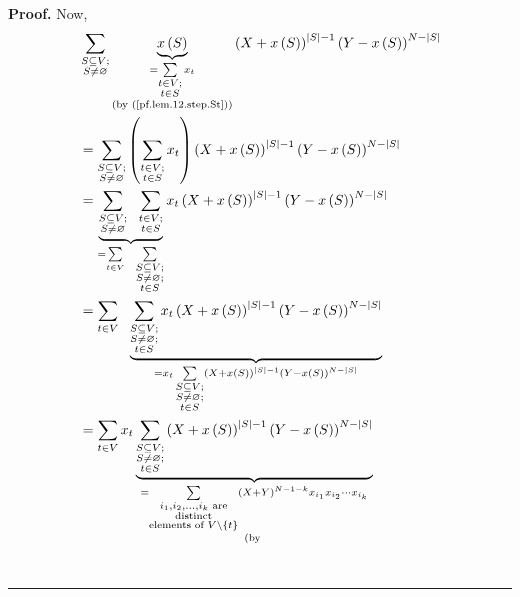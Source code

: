 \documentclass[numbers=enddot,12pt,final,onecolumn,notitlepage]{scrartcl}%
\theoremstyle{definition}
\newenvironment{proof}[1][Proof]{\noindent\textbf{#1.} }{\ \rule{0.5em}{0.5em}}
\let\sumnonlimits\sum
\renewcommand{\sum}{\sumnonlimits\limits}
\newenvironment{verlong}{}{}
\begin{document}
\begin{verlong}
\begin{proof}
Now,
\begin{align*}
&  \sum_{\substack{S\subseteq V;\\S\neq\varnothing}}\underbrace{x\left(
S\right)  }_{\substack{=\sum_{\substack{t\in V;\\t\in S}}x_{t}\\\text{(by
(\ref{pf.lem.12.step.St}))}}}\left(  X+x\left(  S\right)  \right)
^{\left\vert S\right\vert -1}\left(  Y-x\left(  S\right)  \right)
^{N-\left\vert S\right\vert }\\
&  =\sum_{\substack{S\subseteq V;\\S\neq\varnothing}}\left(  \sum
_{\substack{t\in V;\\t\in S}}x_{t}\right)  \left(  X+x\left(  S\right)
\right)  ^{\left\vert S\right\vert -1}\left(  Y-x\left(  S\right)  \right)
^{N-\left\vert S\right\vert }\\
&  =\underbrace{\sum_{\substack{S\subseteq V;\\S\neq\varnothing}%
}\ \ \sum_{\substack{t\in V;\\t\in S}}}_{=\sum_{t\in V}\ \ \sum
_{\substack{S\subseteq V;\\S\neq\varnothing;\\t\in S}}}x_{t}\left(  X+x\left(
S\right)  \right)  ^{\left\vert S\right\vert -1}\left(  Y-x\left(  S\right)
\right)  ^{N-\left\vert S\right\vert }\\
&  =\sum_{t\in V}\ \ \underbrace{\sum_{\substack{S\subseteq V;\\S\neq
\varnothing;\\t\in S}}x_{t}\left(  X+x\left(  S\right)  \right)  ^{\left\vert
S\right\vert -1}\left(  Y-x\left(  S\right)  \right)  ^{N-\left\vert
S\right\vert }}_{=x_{t}\sum_{\substack{S\subseteq V;\\S\neq\varnothing;\\t\in
S}}\left(  X+x\left(  S\right)  \right)  ^{\left\vert S\right\vert -1}\left(
Y-x\left(  S\right)  \right)  ^{N-\left\vert S\right\vert }}\\
&  =\sum_{t\in V}x_{t}\underbrace{\sum_{\substack{S\subseteq V;\\S\neq
\varnothing;\\t\in S}}\left(  X+x\left(  S\right)  \right)  ^{\left\vert
S\right\vert -1}\left(  Y-x\left(  S\right)  \right)  ^{N-\left\vert
S\right\vert }}_{\substack{=\sum_{\substack{i_{1},i_{2},\ldots,i_{k}\text{
are}\\\text{distinct}\\\text{elements of }V\setminus\left\{  t\right\}
}}\left(  X+Y\right)  ^{N-1-k}x_{i_{1}}x_{i_{2}}\cdots x_{i_{k}}\\\text{(by
}}}
\end{align*}
\end{proof}
\end{verlong}
\end{document}
